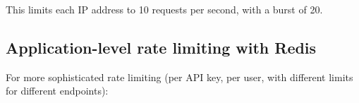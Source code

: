 \begin{codebox}[short]

\begin{Shaded}
\begin{Highlighting}[]
\end{Highlighting}
\end{Shaded}

\end{codebox}

\noindent{}This limits each IP address to 10 requests per second, with a burst of 20.

\subsection*{Application-level rate limiting with Redis}\label{36-scaling-load:application-level-rate-limiting-with-redis}

For more sophisticated rate limiting (per API key, per user, with different limits for different endpoints):

